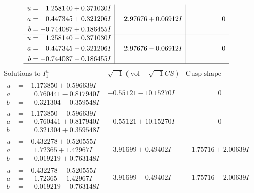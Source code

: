 \documentclass[1p]{elsarticle_modified}
\theoremstyle{definition}
\newcommand{\I}{\sqrt{-1}}
\begin{document}
$$\begin{array}{c|c|c}
\begin{aligned}
u &= \phantom{-}1.258140 + 0.371030 I \\
a &= \phantom{-}0.447345 + 0.321206 I \\
b &= -0.744087 + 0.186455 I\end{aligned}
 & \phantom{-}2.97676 + 0.06912 I & \phantom{-0.000000 } 0 \\ \hline\begin{aligned}
u &= \phantom{-}1.258140 - 0.371030 I \\
a &= \phantom{-}0.447345 - 0.321206 I \\
b &= -0.744087 - 0.186455 I\end{aligned}
 & \phantom{-}2.97676 - 0.06912 I & \phantom{-0.000000 } 0\\
 \hline 
 \end{array}$$\newpage$$\begin{array}{c|c|c}  
\text{Solutions to }I^u_{1}& \I (\text{vol} + \sqrt{-1}CS) & \text{Cusp shape}\\
 \hline 
\begin{aligned}
u &= -1.173850 + 0.596639 I \\
a &= \phantom{-}0.760441 - 0.817940 I \\
b &= \phantom{-}0.321304 - 0.359548 I\end{aligned}
 & -0.55121 - 10.15270 I & \phantom{-0.000000 } 0 \\ \hline\begin{aligned}
u &= -1.173850 - 0.596639 I \\
a &= \phantom{-}0.760441 + 0.817940 I \\
b &= \phantom{-}0.321304 + 0.359548 I\end{aligned}
 & -0.55121 + 10.15270 I & \phantom{-0.000000 } 0 \\ \hline\begin{aligned}
u &= -0.432278 + 0.520555 I \\
a &= \phantom{-}1.72365 + 1.42967 I \\
b &= \phantom{-}0.019219 + 0.763148 I\end{aligned}
 & -3.91699 + 0.49402 I & -1.75716 + 2.00639 I \\ \hline\begin{aligned}
u &= -0.432278 - 0.520555 I \\
a &= \phantom{-}1.72365 - 1.42967 I \\
b &= \phantom{-}0.019219 - 0.763148 I\end{aligned}
 & -3.91699 - 0.49402 I & -1.75716 - 2.00639 I \\ \hline\begin{aligned}

\end{aligned}
\end{array}$$
\end{document}
